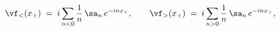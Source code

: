 \begin{equation}
\vf_{<}(x_+)\;=\; 
i\sum_{n< 0}
\frac{1}{n}\, \sa_n \, e^{-inx_+},
\qquad
\vf_{>}(x_+)\;=\;
i\sum_{n> 0}
\frac{1}{n}\,\sa_n \,e^{-inx_+},
\end{equation}

